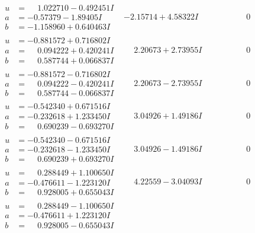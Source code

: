 \documentclass[1p]{elsarticle_modified}
\theoremstyle{definition}
\begin{document}
$$\begin{array}{c|c|c}
\begin{aligned}
u &= \phantom{-}1.022710 - 0.492451 I \\
a &= -0.57379 - 1.89405 I \\
b &= -1.158960 + 0.640463 I\end{aligned}
 & -2.15714 + 4.58322 I & \phantom{-0.000000 } 0 \\ \hline\begin{aligned}
u &= -0.881572 + 0.716802 I \\
a &= \phantom{-}0.094222 + 0.420241 I \\
b &= \phantom{-}0.587744 + 0.066837 I\end{aligned}
 & \phantom{-}2.20673 + 2.73955 I & \phantom{-0.000000 } 0 \\ \hline\begin{aligned}
u &= -0.881572 - 0.716802 I \\
a &= \phantom{-}0.094222 - 0.420241 I \\
b &= \phantom{-}0.587744 - 0.066837 I\end{aligned}
 & \phantom{-}2.20673 - 2.73955 I & \phantom{-0.000000 } 0 \\ \hline\begin{aligned}
u &= -0.542340 + 0.671516 I \\
a &= -0.232618 + 1.233450 I \\
b &= \phantom{-}0.690239 - 0.693270 I\end{aligned}
 & \phantom{-}3.04926 + 1.49186 I & \phantom{-0.000000 } 0 \\ \hline\begin{aligned}
u &= -0.542340 - 0.671516 I \\
a &= -0.232618 - 1.233450 I \\
b &= \phantom{-}0.690239 + 0.693270 I\end{aligned}
 & \phantom{-}3.04926 - 1.49186 I & \phantom{-0.000000 } 0 \\ \hline\begin{aligned}
u &= \phantom{-}0.288449 + 1.100650 I \\
a &= -0.476611 - 1.223120 I \\
b &= \phantom{-}0.928005 + 0.655043 I\end{aligned}
 & \phantom{-}4.22559 - 3.04093 I & \phantom{-0.000000 } 0 \\ \hline\begin{aligned}
u &= \phantom{-}0.288449 - 1.100650 I \\
a &= -0.476611 + 1.223120 I \\
b &= \phantom{-}0.928005 - 0.655043 I\end{aligned}

\end{array}$$
\end{document}
